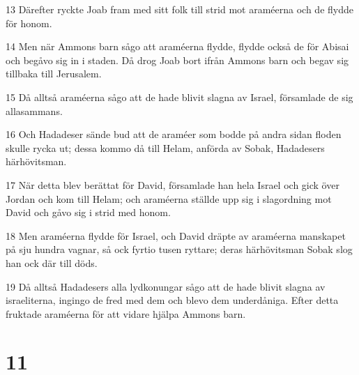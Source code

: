 \par 13 Därefter ryckte Joab fram med sitt folk till strid mot araméerna och de flydde för honom.
\par 14 Men när Ammons barn sågo att araméerna flydde, flydde också de för Abisai och begåvo sig in i staden. Då drog Joab bort ifrån Ammons barn och begav sig tillbaka till Jerusalem.
\par 15 Då alltså araméerna sågo att de hade blivit slagna av Israel, församlade de sig allasammans.
\par 16 Och Hadadeser sände bud att de araméer som bodde på andra sidan floden skulle rycka ut; dessa kommo då till Helam, anförda av Sobak, Hadadesers härhövitsman.
\par 17 När detta blev berättat för David, församlade han hela Israel och gick över Jordan och kom till Helam; och araméerna ställde upp sig i slagordning mot David och gåvo sig i strid med honom.
\par 18 Men araméerna flydde för Israel, och David dräpte av araméerna manskapet på sju hundra vagnar, så ock fyrtio tusen ryttare; deras härhövitsman Sobak slog han ock där till döds.
\par 19 Då alltså Hadadesers alla lydkonungar sågo att de hade blivit slagna av israeliterna, ingingo de fred med dem och blevo dem underdåniga. Efter detta fruktade araméerna för att vidare hjälpa Ammons barn.

\chapter{11}


